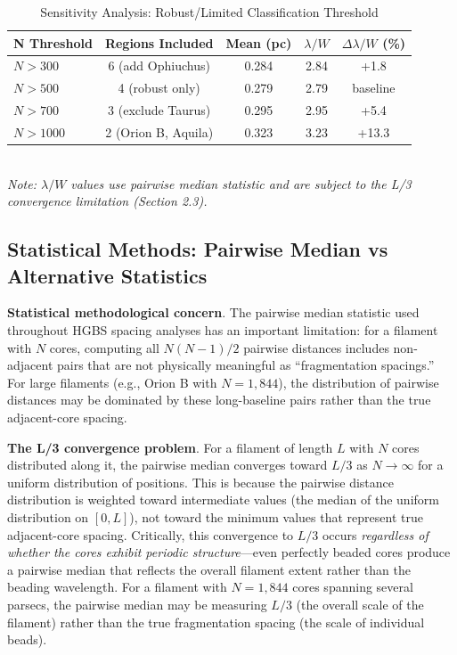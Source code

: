 \documentclass[twocolumn,usenatbib]{mnras}
\begin{document}
\begin{table}[h]
\caption{Sensitivity Analysis: Robust/Limited Classification Threshold}
\label{tab:threshold_sensitivity}
\begin{tabular}{lcccc}
\toprule
N Threshold & Regions Included & Mean (pc) & $\lambda/W$ & $\Delta\lambda/W$ (\%) \\
\midrule
$N > 300$    & 6 (add Ophiuchus) & 0.284 & 2.84 & +1.8 \\
$N > 500$    & 4 (robust only)   & 0.279 & 2.79 & baseline \\
$N > 700$    & 3 (exclude Taurus) & 0.295 & 2.95 & +5.4 \\
$N > 1000$   & 2 (Orion B, Aquila) & 0.323 & 3.23 & +13.3 \\
\bottomrule
\end{tabular}
\\
\footnotesize
\textit{Note: $\lambda/W$ values use pairwise median statistic and are subject to the L/3 convergence limitation (Section 2.3).}
\end{table}

\subsection{Statistical Methods: Pairwise Median vs Alternative Statistics}
\label{sec:statistics}

\textbf{Statistical methodological concern}. The pairwise median statistic used throughout HGBS spacing analyses has an important limitation: for a filament with $N$ cores, computing all $N(N-1)/2$ pairwise distances includes non-adjacent pairs that are not physically meaningful as ``fragmentation spacings.'' For large filaments (e.g., Orion B with $N = 1,844$), the distribution of pairwise distances may be dominated by these long-baseline pairs rather than the true adjacent-core spacing.

\textbf{The L/3 convergence problem}. For a filament of length $L$ with $N$ cores distributed along it, the pairwise median converges toward $L/3$ as $N \to \infty$ for a uniform distribution of positions. This is because the pairwise distance distribution is weighted toward intermediate values (the median of the uniform distribution on $[0, L]$), not toward the minimum values that represent true adjacent-core spacing. Critically, this convergence to $L/3$ occurs \textit{regardless of whether the cores exhibit periodic structure}—even perfectly beaded cores produce a pairwise median that reflects the overall filament extent rather than the beading wavelength. For a filament with $N = 1,844$ cores spanning several parsecs, the pairwise median may be measuring $L/3$ (the overall scale of the filament) rather than the true fragmentation spacing (the scale of individual beads).
\end{document}
